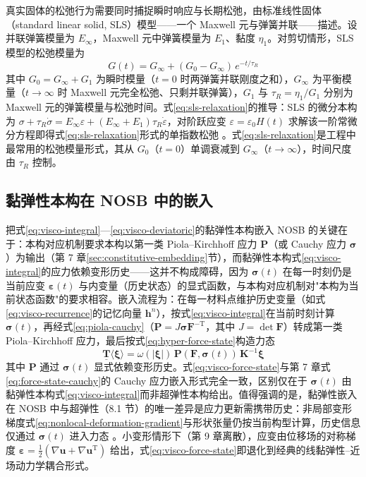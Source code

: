 真实固体的松弛行为需要同时捕捉瞬时响应与长期松弛，由标准线性固体（standard linear solid, SLS）模型——一个 Maxwell 元与弹簧并联——描述。设并联弹簧模量为 $E_{\infty}$，Maxwell 元中弹簧模量为 $E_{1}$、黏度 $\eta_{1}$。对剪切情形，SLS 模型的松弛模量为
\begin{equation}
  G(t)=G_{\infty}+(G_{0}-G_{\infty})\,e^{-t/\tau_{R}}
  \label{eq:sls-relaxation}
\end{equation}
其中 $G_{0}=G_{\infty}+G_{1}$ 为瞬时模量（$t=0$ 时两弹簧并联刚度之和），$G_{\infty}$ 为平衡模量（$t\to\infty$ 时 Maxwell 元完全松弛、只剩并联弹簧），$G_{1}$ 与 $\tau_{R}=\eta_{1}/G_{1}$ 分别为 Maxwell 元的弹簧模量与松弛时间。式\eqref{eq:sls-relaxation}的推导：SLS 的微分本构为 $\sigma+\tau_{R}\dot{\sigma}=E_{\infty}\varepsilon+(E_{\infty}+E_{1})\tau_{R}\dot{\varepsilon}$，对阶跃应变 $\varepsilon=\varepsilon_{0}H(t)$ 求解该一阶常微分方程即得式\eqref{eq:sls-relaxation}形式的单指数松弛 \cite{Christensen1982}。式\eqref{eq:sls-relaxation}是工程中最常用的松弛模量形式，其从 $G_{0}$（$t=0$）单调衰减到 $G_{\infty}$（$t\to\infty$），时间尺度由 $\tau_{R}$ 控制。

\subsection{黏弹性本构在 NOSB 中的嵌入}\label{sec:visco-nosb}

把式\eqref{eq:visco-integral}—\eqref{eq:visco-deviatoric}的黏弹性本构嵌入 NOSB 的关键在于：本构对应机制要求本构以第一类 Piola--Kirchhoff 应力 $\mathbf{P}$（或 Cauchy 应力 $\boldsymbol{\sigma}$）为输出（第 7 章\ref{sec:constitutive-embedding}节），而黏弹性本构式\eqref{eq:visco-integral}的应力依赖变形历史——这并不构成障碍，因为 $\boldsymbol{\sigma}(t)$ 在每一时刻仍是当前应变 $\boldsymbol{\varepsilon}(t)$ 与内变量（历史状态）的显式函数，与本构对应机制对"本构为当前状态函数"的要求相容。嵌入流程为：在每一材料点维护历史变量（如式\eqref{eq:visco-recurrence}的记忆向量 $\mathbf{h}^{n}$），按式\eqref{eq:visco-integral}在当前时刻计算 $\boldsymbol{\sigma}(t)$，再经式\eqref{eq:piola-cauchy}（$\mathbf{P}=J\boldsymbol{\sigma}\mathbf{F}^{-\mathrm{T}}$，其中 $J=\det\mathbf{F}$）转成第一类 Piola--Kirchhoff 应力，最后按式\eqref{eq:hyper-force-state}构造力态
\begin{equation}
  \underline{\mathbf{T}}\langle\boldsymbol{\xi}\rangle
  =\omega(|\boldsymbol{\xi}|)\,\mathbf{P}(\mathbf{F},\boldsymbol{\sigma}(t))\,\mathbf{K}^{-1}\boldsymbol{\xi}
  \label{eq:visco-force-state}
\end{equation}
其中 $\mathbf{P}$ 通过 $\boldsymbol{\sigma}(t)$ 显式依赖变形历史。式\eqref{eq:visco-force-state}与第 7 章式\eqref{eq:force-state-cauchy}的 Cauchy 应力嵌入形式完全一致，区别仅在于 $\boldsymbol{\sigma}(t)$ 由黏弹性本构式\eqref{eq:visco-integral}而非超弹性本构给出。值得强调的是，黏弹性嵌入在 NOSB 中与超弹性（8.1 节）的唯一差异是应力更新需携带历史：非局部变形梯度式\eqref{eq:nonlocal-deformation-gradient}与形状张量仍按当前构型计算，历史信息仅通过 $\boldsymbol{\sigma}(t)$ 进入力态 \cite{Galadima2024}。小变形情形下（第 9 章离散），应变由位移场的对称梯度 $\boldsymbol{\varepsilon}=\tfrac{1}{2}(\nabla\mathbf{u}+\nabla\mathbf{u}^{\mathrm{T}})$ 给出，式\eqref{eq:visco-force-state}即退化到经典的线黏弹性--近场动力学耦合形式。

